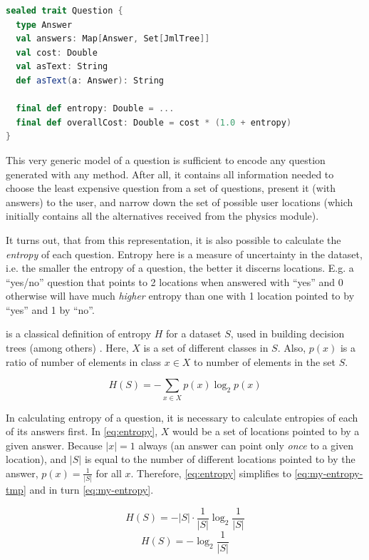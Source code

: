 \begin{lstlisting}[language=Scala,caption={Definition of a question super-type.},label=lst:question]
sealed trait Question {
  type Answer
  val answers: Map[Answer, Set[JmlTree]]
  val cost: Double
  val asText: String
  def asText(a: Answer): String

  final def entropy: Double = ...
  final def overallCost: Double = cost * (1.0 + entropy)
}
\end{lstlisting}

This very generic model of a question is sufficient to encode any question generated with any method. After all, it contains all information needed to choose the least expensive question from a set of questions, present it (with answers) to the user, and narrow down the set of possible user locations (which initially contains all the alternatives received from the physics module).

It turns out, that from this representation, it is also possible to calculate the \emph{entropy} of each question. Entropy here is a measure of uncertainty in the dataset, i.e. the smaller the entropy of a question, the better it discerns locations. E.g. a ``yes/no'' question that points to 2 locations when answered with ``yes'' and 0 otherwise will have much \emph{higher} entropy than one with 1 location pointed to by ``yes'' and 1 by ``no''.

 is a classical definition of entropy $H$ for a dataset $S$, used in building decision trees (among others) \cite{quinlan1986induction}. Here, $X$ is a set of different classes in $S$. Also, $p(x)$ is a ratio of number of elements in class $x \in X$ to number of elements in the set $S$.

\begin{equation}
  \label{eq:entropy}
  H(S)=-\sum_{x \in X} p(x) \log_2 p(x)
\end{equation}

In calculating entropy of a question, it is necessary to calculate entropies of each of its answers first. In \cref{eq:entropy}, $X$ would be a set of locations pointed to by a given answer. Because $\vert x \vert = 1$ always (an answer can point only \emph{once} to a given location), and $\vert S \vert$ is equal to the number of different locations pointed to by the answer, $p(x)=\frac{1}{\vert S \vert}$ for all $x$. Therefore, \cref{eq:entropy} simplifies to \cref{eq:my-entropy-tmp} and in turn \cref{eq:my-entropy}.

\begin{equation}
  \label{eq:my-entropy-tmp}
  H(S) = -\vert S \vert \cdot \frac{1}{\vert S \vert} \log_2 \frac{1}{\vert S \vert}
\end{equation}
\begin{equation}
  \label{eq:my-entropy}
  H(S) = -\log_2 \frac{1}{\vert S \vert}
\end{equation}

